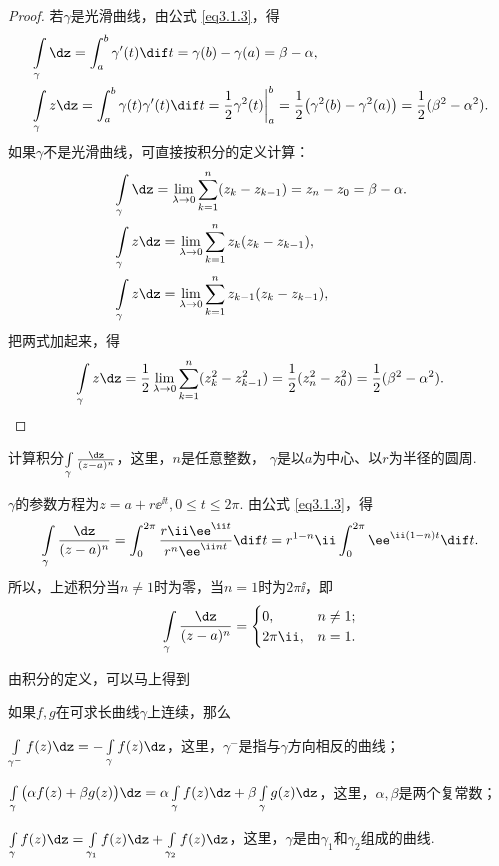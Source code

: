 \begin{proof}
  若$\gamma$是光滑曲线，由公式 \eqref{eq3.1.3}，得
  \begin{align*}
    & \int\limits_\gamma \dz = \int_a^b\gamma'(t)\dif t=\gamma(b)-\gamma(a)=\beta-\alpha,\\
    & \int\limits_\gamma z\dz = \int_a^b\gamma(t)\gamma'(t)\dif t
      = \frac12\gamma^2(t)\bigg|_a^b = \frac12\big(\gamma^2(b)-\gamma^2(a)\big)
      = \frac12(\beta^2-\alpha^2).
  \end{align*}
  如果$\gamma$不是光滑曲线，可直接按积分的定义计算：
  \begin{align*}
  &\int\limits_\gamma\dz=\lim_{\lambda\to0}\sum_{k=1}^n(z_k-z_{k-1})
  =z_n-z_0=\beta-\alpha.\\
  &\int\limits_\gamma z\dz=\lim_{\lambda\to0}\sum_{k=1}^nz_k(z_k-z_{k-1}),\\
  &\int\limits_\gamma z\dz=\lim_{\lambda\to0}\sum_{k=1}^nz_{k-1}(z_k-z_{k-1}),
  \end{align*}
  把两式加起来，得
  \begin{equation*}
    \int\limits_\gamma z\dz=\frac12\lim_{\lambda\to0}
    \sum_{k=1}^n(z_k^2-z_{k-1}^2)=\frac12(z_n^2-z_0^2)=\frac12(\beta^2-\alpha^2).
  \end{equation*}
\end{proof}

\begin{example}\label{exam3.1.4}
计算积分$\int\limits_\gamma\frac{\dz}{(z-a)^n}$，这里，$n$是任意整数，
$\gamma$是以$a$为中心、以$r$为半径的圆周.
\end{example}
\begin{solution}
$\gamma$的参数方程为$z=a+r\ee^{\ii t},0\le t\le2\pi$. 由公式 \eqref{eq3.1.3}，得
\[\int\limits_\gamma\frac{\dz}{(z-a)^n}=\int_0^{2\pi}\frac{r\ii\ee^{\ii t}}{r^n\ee^{\ii nt}}\dif t=r^{1-n}\ii\int_0^{2\pi}\ee^{\ii(1-n)t}\dif t.\]
所以，上述积分当$n\ne1$时为零，当$n=1$时为$2\pi\ii$，即
\begin{equation*}\int\limits_\gamma\frac{\dz}{(z-a)^n}=\begin{cases}
0,&n\ne1;\\
2\pi\ii,&n=1.
\end{cases}
\end{equation*}
\end{solution}

由积分的定义，可以马上得到
\begin{prop}\label{prop3.1.5}
如果$f,g$在可求长曲线$\gamma$上连续，那么
\begin{eenum}
  \item \label{prop3.1.5.1} $\int\limits_{\gamma^-}f(z)\dz=-\int\limits_\gamma f(z)\dz$，这里，$\gamma^-$是指与$\gamma$方向相反的曲线；
  \item \label{prop3.1.5.2} $\int\limits_\gamma\big(\alpha f(z)+\beta g(z)\big)\dz
  =\alpha\int\limits_\gamma f(z)\dz+\beta\int\limits_\gamma g(z)\dz$，这里，$\alpha,\beta$是两个复常数；
  \item \label{prop3.1.5.3} $\int\limits_\gamma f(z)\dz=\int\limits_{\gamma_1}f(z)\dz+\int\limits_{\gamma_2}f(z)\dz$，这里，$\gamma$是由$\gamma_1$和$\gamma_2$组成的曲线.
\end{eenum}
\end{prop}

